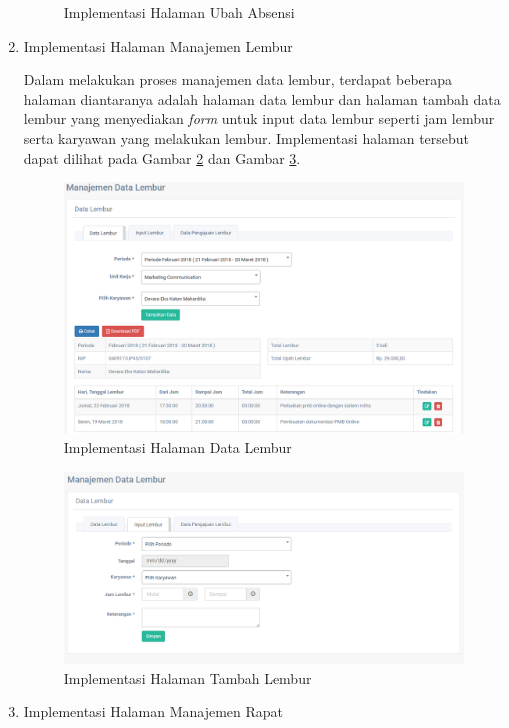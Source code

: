 \begin{enumerate}
\begin{figure}[H]
                \caption{Implementasi Halaman Ubah Absensi}
                \label{imp_hal_ubah_absensi}
            \end{figure}
            \item Implementasi Halaman Manajemen Lembur
            
            Dalam melakukan proses manajemen data lembur, terdapat beberapa halaman diantaranya adalah halaman data lembur dan halaman tambah data lembur yang menyediakan \emph{form} untuk input data lembur seperti jam lembur serta karyawan yang melakukan lembur. Implementasi halaman tersebut dapat dilihat pada Gambar \ref{imp_hal_data_lembur} dan Gambar \ref{imp_hal_tambah_lembur}.
	        \begin{figure}[H]
                \centering
                \includegraphics[width=13cm]{gambar/halaman/halaman-data-lembur}
                \caption{Implementasi Halaman Data Lembur}
                \label{imp_hal_data_lembur}
            \end{figure}
            \begin{figure}[H]
                \centering
                \includegraphics[width=13cm]{gambar/halaman/halaman-tambah-lembur}
                \caption{Implementasi Halaman Tambah Lembur}
                \label{imp_hal_tambah_lembur}
            \end{figure}
            \item Implementasi Halaman Manajemen Rapat
            

\end{enumerate}
